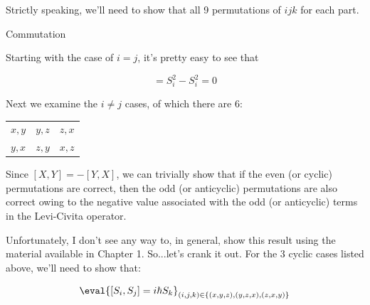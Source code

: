 \begin{answer}
  Strictly speaking, we'll need to show that all 9 permutations of
  $ijk$ for each part.


  \begin{answerpart}{Commutation}

    Starting with the case of $i=j$, it's pretty easy to see that

    \begin{equation}
      [S_i, S_i] = S_i^2 - S_i^2 = 0
    \end{equation}

    Next we examine the $i \ne j$ cases, of which there are 6:
    \begin{tabular}{ccc}
      $x, y$ & $y, z$ & $z, x$\\
      $y, x$ & $z, y$ & $x, z$\\
    \end{tabular}

    Since $[X, Y] = -[Y, X]$, we can trivially show that if the even (or
    cyclic) permutations are correct, then the odd (or anticyclic)
    permutations are also correct owing to the negative value
    associated with the odd (or anticyclic) terms in the Levi-Civita
    operator.

    Unfortunately, I don't see any way to, in general, show this
    result using the material available in Chapter 1.  So...let's
    crank it out.  For the 3 cyclic cases listed above, we'll need to show that:

    \begin{equation}
      \eval{[S_i, S_j] = i \hbar S_k}_{(i, j, k) \in \{(x, y, z),  (y, z, x),  (z, x, y)\}}
    \end{equation}
    

\end{answerpart}
\end{answer}
